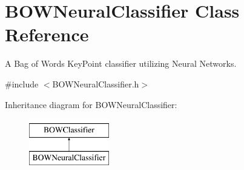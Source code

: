 \hypertarget{classBOWNeuralClassifier}{
\section{BOWNeuralClassifier Class Reference}
\label{classBOWNeuralClassifier}
}


A Bag of Words KeyPoint classifier utilizing Neural Networks.  




{\ttfamily \#include $<$BOWNeuralClassifier.h$>$}

Inheritance diagram for BOWNeuralClassifier:\begin{figure}[H]
\begin{center}
\leavevmode
\includegraphics[height=2cm]{classBOWNeuralClassifier}
\end{center}
\end{figure}
